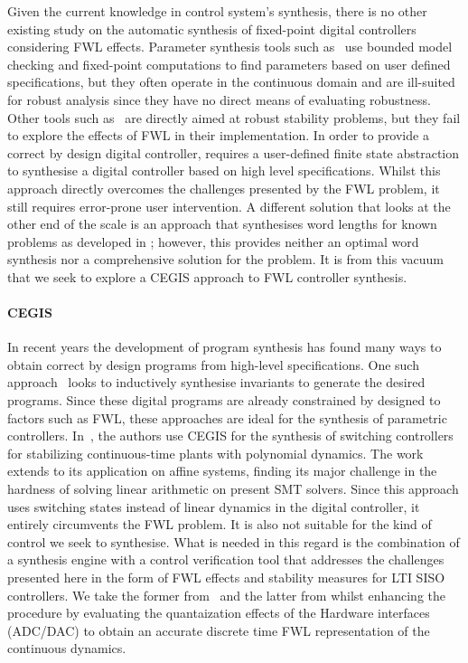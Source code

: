 \documentclass{sig-alternate-05-2015}
\begin{document}
Given the current knowledge in control system's synthesis, there is no other 
existing study on the automatic synthesis of fixed-point digital controllers 
considering FWL effects.  Parameter synthesis tools such as~\cite{cimatti2013parameter} 
use bounded model checking and fixed-point computations to find parameters based on user
defined specifications, but they often operate in the continuous domain and
are ill-suited for robust analysis since they have no direct means of
evaluating robustness.  Other tools such as~\cite{economakos2016automated}
are directly aimed at robust stability problems, but they fail to explore the
effects of FWL in their implementation.  In order to provide a correct by
design digital controller, \cite{alur2016compositional} requires a user-defined
finite state abstraction to synthesise a digital controller based on high
level specifications.  Whilst this approach directly overcomes the
challenges presented by the FWL problem, it still requires error-prone user
intervention.  A different solution that looks at the other end of the scale
is an approach that synthesises word lengths for known problems as developed
in \cite{jha2013swati}; however, this provides neither an optimal word
synthesis nor a comprehensive solution for the problem.  It is from this
vacuum that we seek to explore a CEGIS approach to FWL controller synthesis.

\paragraph{CEGIS}

In recent years the development of program synthesis has found many ways to
obtain correct by design programs from high-level specifications.  One such
approach~\cite{itzhaky2010simple} looks to inductively synthesise invariants
to generate the desired programs.  Since these digital programs are already
constrained by designed to factors such as FWL, these approaches are ideal
for the synthesis of parametric controllers. 
In~\cite{DBLP:conf/cdc/RavanbakhshS15}, the authors use CEGIS for the
synthesis of switching controllers for stabilizing continuous-time plants
with polynomial dynamics.  The work extends to its application on affine
systems, finding its major challenge in the hardness of solving linear
arithmetic on present SMT solvers.  Since this approach uses switching
states instead of linear dynamics in the digital controller, it entirely
circumvents the FWL problem.  It is also not suitable for the kind of
control we seek to synthesise.  What is needed in this regard is the
combination of a synthesis engine with a control verification tool that
addresses the challenges presented here in the form of FWL effects and
stability measures for LTI SISO controllers.  We take the former
from~\cite{DBLP:conf/lpar/DavidKL15} and the latter from \cite{daes20161} whilst enhancing the
procedure by evaluating the quantaization effects of the Hardware interfaces
(ADC/DAC) to obtain an accurate discrete time FWL representation of the
continuous dynamics.
 
\end{document}
